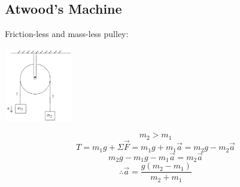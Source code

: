 \documentclass{article}
\begin{document}
  	\subsection{Atwood's Machine}
  		Friction-less and mass-less pulley:
  
  		\begin{multicols}{2}
  			\centerline{\includegraphics[width=3cm]{atwood.png}}
  		\columnbreak
        	\[
            	m_2>m_1
            \]
  			\[
            	T=m_1g+\Sigma\vec{F}=m_1g+m_1\vec{a}=m_2g-m_2\vec{a}
            \]
  			\[
            	m_2g-m_1g-m_1\vec{a}=m_2\vec{a}
            \]
  			\[
            	\therefore\vec{a}=\frac{g(m_2-m_1)}{m_2+m_1}
            \]
  		\end{multicols}
  
\end{document}
